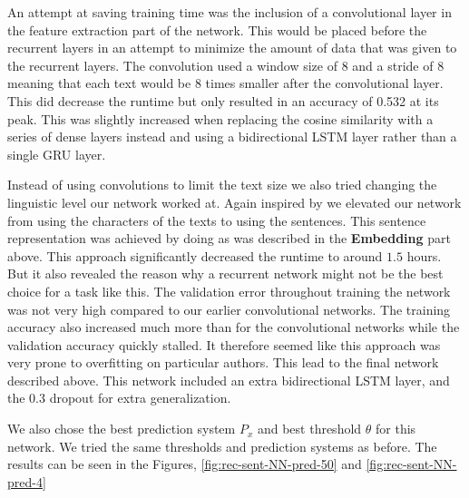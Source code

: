 An attempt at saving training time was the inclusion of a convolutional layer
in the feature extraction part of the network. This would be placed before the
recurrent layers in an attempt to minimize the amount of data that was given to
the recurrent layers. The convolution used a window size of 8 and a stride of 8
meaning that each text would be 8 times smaller after the convolutional layer.
This did decrease the runtime but only resulted in an accuracy of 0.532 at its
peak. This was slightly increased when replacing the cosine similarity with a
series of dense layers instead and using a bidirectional \gls{LSTM} layer rather
than a single \gls{GRU} layer.

Instead of using convolutions to limit the text size we also tried changing
the linguistic level our network worked at. Again inspired by \cite{qian:2018}
we elevated our network from using the characters of the texts to using the
sentences. This sentence representation was achieved by doing as was described
in the \textbf{Embedding} part above. This approach significantly decreased
the runtime to around $1.5$ hours. But it also revealed the reason why a
recurrent network might not be the best choice for a task like this. The
validation error throughout training the network was not very high compared to
our earlier convolutional networks. The training accuracy also increased much
more than for the convolutional networks while the validation accuracy quickly
stalled. It therefore seemed like this approach was very prone to overfitting on
particular authors. This lead to the final network described above. This network
included an extra bidirectional \gls{LSTM} layer, and the 0.3 dropout for extra
generalization.

We also chose the best prediction system $P_x$ and best threshold $\theta$ for
this network. We tried the same thresholds and prediction systems as before.
The results can be seen in the Figures, \ref{fig:rec-sent-NN-pred-50} and
\ref{fig:rec-sent-NN-pred-4}

